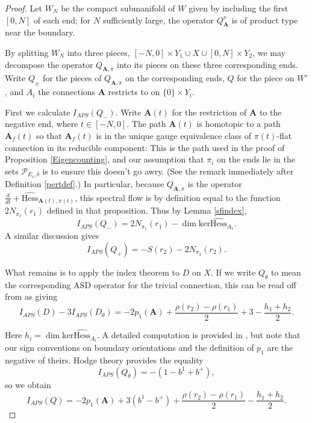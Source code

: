 \documentclass{memo-l}
\theoremstyle{definition}
\theoremstyle{remark}
\numberwithin{section}{chapter}
\numberwithin{equation}{chapter}
\begin{document}
\begin{proof}Let $W_N$ be the compact submanifold of $W$ given by including the first $[0,N]$ of each end; for $N$ sufficiently large, the operator $Q_{\mathbf{A}}^\nu$ is of product type near the boundary.

By splitting $W_N$ into three pieces, $[-N, 0] \times Y_1 \cup X \cup [0, N] \times Y_2$, we may decompose the operator $Q_{\mathbf{A},\pi}$ into its pieces on these three corresponding ends. Write $Q_\pm$ for the pieces of $Q_{\mathbf{A},\pi}$ on the corresponding ends, $Q$ for the piece on $W'$, and $A_i$ the connections $\mathbf{A}$ restricts to on $\{0\} \times Y_i$.

First we calculate $I_{APS}(Q_-)$. Write $\mathbf{A}(t)$ for the restriction of $\mathbf{A}$ to the negative end, where $t \in [-N, 0]$. The path $\mathbf{A}(t)$ is homotopic to a path $\mathbf{A}_f(t)$ so that $\mathbf{A}_f(t)$ is in the unique gauge equivalence class of $\pi(t)$-flat connection in its reducible component: This is the path used in the proof of Proposition \ref{Eigencounting}, and our assumption that $\pi_i$ on the ends lie in the sets $\mathcal P_{E_i, \delta}$ is to ensure this doesn't go awry. (See the remark immediately after Definition \ref{pertdef}.) In particular, because $Q_{\mathbf{A},\pi}$ is the operator $\frac{d}{dt} + \widehat{\text{Hess}}_{\mathbf{A}(t),\pi(t)}$, this spectral flow is by definition equal to the function $2N_{\pi_1}(r_1)$ defined in that proposition. Thus by Lemma \ref{sfindex}, $$I_{APS}(Q_-) = 2N_{\pi_1}(r_1) - \dim \text{ker} \widehat{\text{Hess}}_{A_1}.$$ A similar discussion gives $$I_{APS}(Q_+) = -S(r_2) - 2N_{\pi_2}(r_2).$$

What remains is to apply the index theorem to $D$ on $X$. If we write $Q_\theta$ to mean the corresponding ASD operator for the trivial connection, this can be read off from \cite[Proposition~8.4.1]{morgan1994l2} as giving $$I_{APS}(D) - 3I_{APS}(D_\theta) = -2p_1(\mathbf{A}) + \frac{\rho(r_2) - \rho(r_1)}{2} + 3 - \frac{h_1 + h_2}{2}.$$ 

Here $h_i = \dim \text{ker} \widehat{\text{Hess}}_{A_i}$. A detailed computation is provided in \cite[Proposition~2.6]{hedden2011chern}, but note that our sign conventions on boundary orientations and the definition of $p_1$ are the negative of theirs. Hodge theory provides the equality $$I_{APS}(Q_\theta) = -(1-b^1 + b^+),$$ so we obtain $$I_{APS}(Q)= -2p_1(\mathbf{A}) + 3(b^1-b^+) + \frac{\rho(r_2) - \rho(r_1)}{2} - \frac{h_1 + h_2}{2}.$$


\end{proof}
\end{document}
